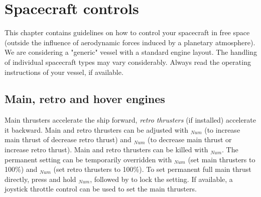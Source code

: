 \documentclass[Orbiter User Manual.tex]{subfiles}
\begin{document}
\section{Spacecraft controls}
\label{sec:controls}
This chapter contains guidelines on how to control your spacecraft in free space (outside the influence of aerodynamic forces induced by a planetary atmosphere). We are considering a "generic" vessel with a standard engine layout. The handling of individual spacecraft types may vary considerably. Always read the operating instructions of your vessel, if available.

\subsection{Main, retro and hover engines}
Main thrusters accelerate the ship forward, \textit{retro thrusters} (if installed) accelerate it backward. Main and retro thrusters can be adjusted with \Ctrl\keystroke{+}$_{Num}$ (to increase main thrust of decrease retro thrust) and \Ctrl\keystroke{-}$_{Num}$ (to decrease main thrust or increase retro thrust). Main and retro thrusters can be killed with \Ctrl\keystroke{*}$_{Num}$. The permanent setting can be temporarily overridden with \keystroke{+}$_{Num}$ (set main thrusters to 100\%) and \keystroke{-}$_{Num}$ (set retro thrusters to 100\%). To set permanent full main thrust directly, press and hold \keystroke{+}$_{Num}$, followed by \Ctrl to lock the setting. If available, a joystick throttle control can be used to set the main thrusters.
\end{document}

